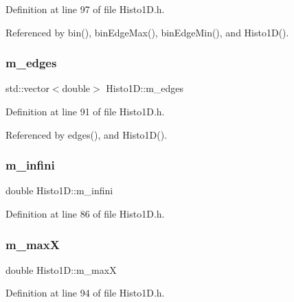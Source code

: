 Definition at line 97 of file Histo1\+D.\+h.



Referenced by bin(), bin\+Edge\+Max(), bin\+Edge\+Min(), and Histo1\+D().

\mbox{\label{classHisto1D_a4188c6d1b4bfc8f9d8bde7616b4dbf5b}} 
\subsubsection{\texorpdfstring{m\+\_\+edges}{m\_edges}}
{\footnotesize\ttfamily std\+::vector$<$double$>$ Histo1\+D\+::m\+\_\+edges\hspace{0.3cm}{\ttfamily [private]}}



Definition at line 91 of file Histo1\+D.\+h.



Referenced by edges(), and Histo1\+D().

\mbox{\label{classHisto1D_a47c1ba33be0574ca167f43a1b27ba1a0}} 
\subsubsection{\texorpdfstring{m\+\_\+infini}{m\_infini}}
{\footnotesize\ttfamily double Histo1\+D\+::m\+\_\+infini\hspace{0.3cm}{\ttfamily [private]}}



Definition at line 86 of file Histo1\+D.\+h.

\mbox{\label{classHisto1D_a6a5007569e096537f9b7b39d2aad865b}} 
\subsubsection{\texorpdfstring{m\+\_\+maxX}{m\_maxX}}
{\footnotesize\ttfamily double Histo1\+D\+::m\+\_\+maxX\hspace{0.3cm}{\ttfamily [private]}}



Definition at line 94 of file Histo1\+D.\+h.



